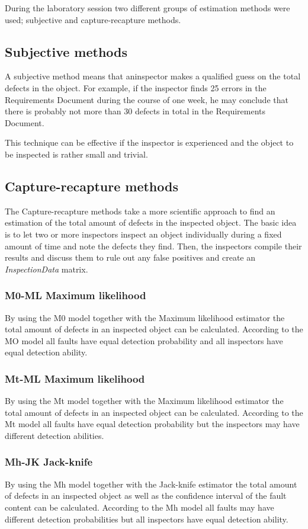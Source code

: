 During the laboratory session two different groups of estimation methods were used; subjective and capture-recapture methods. 

\subsection{Subjective methods}
A subjective method means that aninspector makes a qualified guess on the total defects in the object. 
For example, if the inspector finds 25 errors in the Requirements Document during the course of one week, he may conclude that there is probably not more than 30 defects in total in the Requirements Document.

This technique can be effective if the inspector is experienced and the object to be inspected is rather small and trivial.

\subsection{Capture-recapture methods}
The Capture-recapture methods take a more scientific approach to find an estimation of the total amount of defects in the inspected object. The basic idea is to let two or more inspectors inspect an object individually during a fixed amount of time and note the defects they find. Then, the inspectors compile their results and discuss them to rule out any false positives and create an \textit{InspectionData} matrix.

\subsubsection{M0-ML Maximum likelihood}
By using the M0 model together with the Maximum likelihood estimator the total amount of defects in an inspected object can be calculated. 
According to the MO model all faults have equal detection probability and all inspectors have equal detection ability.

\subsubsection{Mt-ML Maximum likelihood}
By using the Mt model together with the Maximum likelihood estimator the total amount of defects in an inspected object can be calculated. 
According to the Mt model all faults have equal detection probability but the inspectors may have different detection abilities.

\subsubsection{Mh-JK Jack-knife}
By using the Mh model together with the Jack-knife estimator the total amount of defects in an inspected object as well as the confidence interval of the fault content can be calculated. 
According to the Mh model all faults may have different detection probabilities but all inspectors have equal detection ability.  
